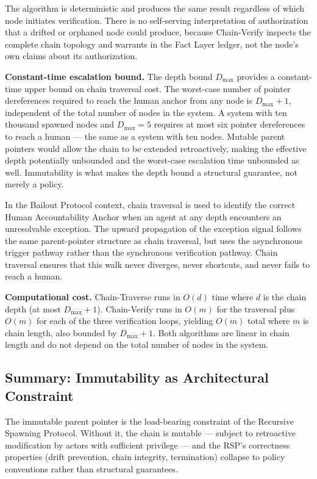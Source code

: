 The algorithm is deterministic and produces the same result regardless of which node initiates verification. There is no self-serving interpretation of authorization that a drifted or orphaned node could produce, because Chain-Verify inspects the complete chain topology and warrants in the Fact Layer ledger, not the node's own claims about its authorization.

\medskip
\noindent\textbf{Constant-time escalation bound.} The depth bound $D_{\max}$ provides a constant-time upper bound on chain traversal cost. The worst-case number of pointer dereferences required to reach the human anchor from any node is $D_{\max} + 1$, independent of the total number of nodes in the system. A system with ten thousand spawned nodes and $D_{\max} = 5$ requires at most six pointer dereferences to reach a human --- the same as a system with ten nodes. Mutable parent pointers would allow the chain to be extended retroactively, making the effective depth potentially unbounded and the worst-case escalation time unbounded as well. Immutability is what makes the depth bound a structural guarantee, not merely a policy.

In the Bailout Protocol context, chain traversal is used to identify the correct Human Accountability Anchor when an agent at any depth encounters an unresolvable exception. The upward propagation of the exception signal follows the same parent-pointer structure as chain traversal, but uses the asynchronous trigger pathway rather than the synchronous verification pathway. Chain traversal ensures that this walk never diverges, never shortcuts, and never fails to reach a human.

\medskip
\noindent\textbf{Computational cost.} Chain-Traverse runs in $O(d)$ time where $d$ is the chain depth (at most $D_{\max} + 1$). Chain-Verify runs in $O(m)$ for the traversal plus $O(m)$ for each of the three verification loops, yielding $O(m)$ total where $m$ is chain length, also bounded by $D_{\max} + 1$. Both algorithms are linear in chain length and do not depend on the total number of nodes in the system.

\subsection{Summary: Immutability as Architectural Constraint}
\label{sec:immutability-summary}

The immutable parent pointer is the load-bearing constraint of the Recursive Spawning Protocol. Without it, the chain is mutable --- subject to retroactive modification by actors with sufficient privilege --- and the RSP's correctness properties (drift prevention, chain integrity, termination) collapse to policy conventions rather than structural guarantees.

